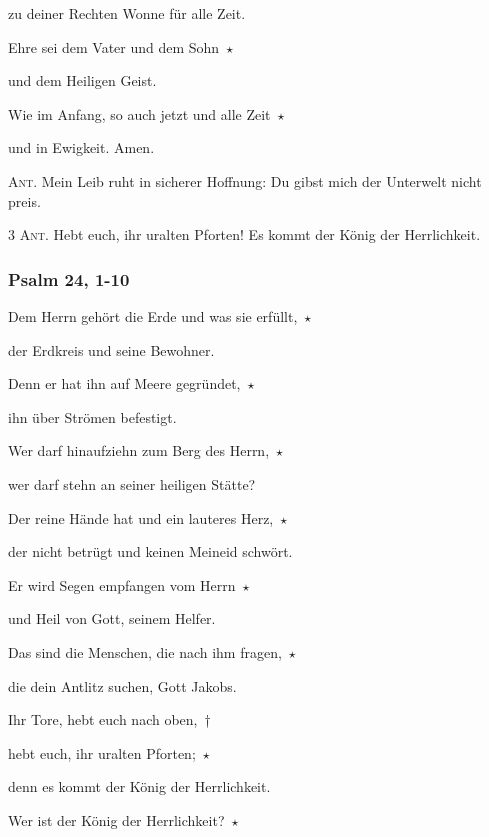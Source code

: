 zu deiner Rechten Wonne für alle Zeit.

\noindent Ehre sei dem Vater und dem Sohn~$\star$~\nopagebreak

und dem Heiligen Geist.

\noindent Wie im Anfang, so auch jetzt und alle Zeit~$\star$~\nopagebreak

und in Ewigkeit. Amen.

\vspace{10pt}

\noindent \textsc{Ant.} Mein Leib ruht in sicherer Hoffnung: Du gibst mich der Unterwelt nicht preis.

\vspace{10pt}

\noindent \textsc{3 Ant.} Hebt euch, ihr uralten Pforten! Es kommt der König der Herrlichkeit.

\subsubsection{Psalm 24, 1-10}

\noindent Dem Herrn gehört die Erde und was sie erfüllt,~$\star$~\nopagebreak

der Erdkreis und seine Bewohner.

\noindent Denn er hat ihn auf Meere gegründet,~$\star$~\nopagebreak

ihn über Strömen befestigt.

\noindent Wer darf hinaufziehn zum Berg des Herrn,~$\star$~\nopagebreak

wer darf stehn an seiner heiligen Stätte?

\noindent Der reine Hände hat und ein lauteres Herz,~$\star$~\nopagebreak

der nicht betrügt und keinen Meineid schwört.

\noindent Er wird Segen empfangen vom Herrn~$\star$~\nopagebreak

und Heil von Gott, seinem Helfer.

\noindent Das sind die Menschen, die nach ihm fragen,~$\star$~\nopagebreak

die dein Antlitz suchen, Gott Jakobs.

\noindent Ihr Tore, hebt euch nach oben,~†~\nopagebreak

hebt euch, ihr uralten Pforten;~$\star$~\nopagebreak

denn es kommt der König der Herrlichkeit.

\noindent Wer ist der König der Herrlichkeit?~$\star$~\nopagebreak

